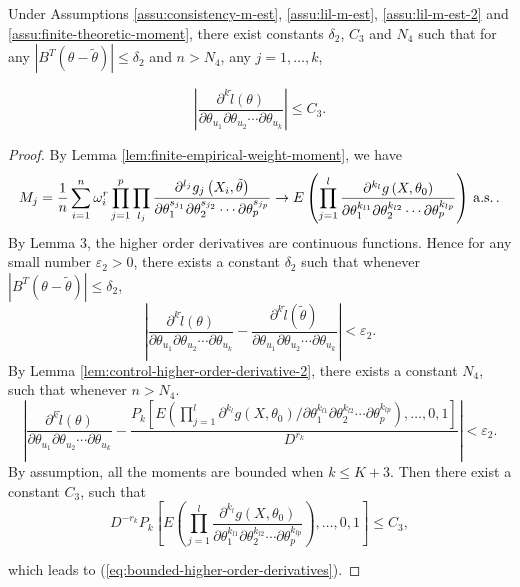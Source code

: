 \begin{lemma}
\label{lem:bounded-high-order-der-2} Under Assumptions \ref{assu:consistency-m-est}, \ref{assu:lil-m-est}, \ref{assu:lil-m-est-2} and 
\ref{assu:finite-theoretic-moment},
there exist constants $\delta_{2}$, $C_{3}$ and $N_{4}$ such that
for any $\left|B^T\left(\theta-\tilde{\theta}\right)\right|\le\delta_{2}$
and $n>N_{4}$, any $j=1,\ldots,k$,%
\begin{comment}
need add consistency conditions for M-Estimator
\end{comment}
{} 
\begin{equation}
\left|\frac{\partial^{k}\tilde{l}\left(\theta\right)}{\partial\theta_{u_{1}}\partial\theta_{u_{2}}\cdots\partial\theta_{u_{k}}}\right|\le C_{3}.\label{eq:bounded-higher-order-derivatives}
\end{equation}
\end{lemma}
\begin{proof}
By Lemma \ref{lem:finite-empirical-weight-moment}, we have 
\[
M_{j}=\frac{1}{n}\sum_{i=1}^{n}\omega_{i}^{r}\prod_{j=1}^{p}\prod_{l_{j}}\frac{\partial^{l_{j}}g_{j}\left(X_{i},\tilde{\theta}\right)}{\partial\theta_{1}^{s_{j_{1}}}\partial\theta_{2}^{s_{j_{2}}}\cdots\partial\theta_{p}^{s_{j_{p}}}}
\rightarrow E\left(\prod_{j=1}^{l}\frac{\partial^{k_{l}}g\left(X,\theta_{0}\right)}{\partial\theta_{1}^{k_{l1}}\partial\theta_{2}^{k_{l2}}\cdots\partial\theta_{p}^{k_{lp}}}\right)\,\mathrm{a.s.}\,.
\]
 By Lemma 3, the higher order
derivatives are continuous functions. Hence for any small number $\varepsilon_{2}>0$,
there exists a constant $\delta_{2}$ such that whenever $\left|B^T\left(\theta-\tilde{\theta}\right)\right|\le\delta_{2}$,
\[
\left|\frac{\partial^{k}\tilde{l}\left(\theta\right)}{\partial\theta_{u_{1}}\partial\theta_{u_{2}}\cdots\partial\theta_{u_{k}}}-\frac{\partial^{k}\tilde{l}\left(\tilde{\theta}\right)}{\partial\theta_{u_{1}}\partial\theta_{u_{2}}\cdots\partial\theta_{u_{k}}}\right|<\varepsilon_{2}.
\]
By Lemma \ref{lem:control-higher-order-derivative-2}, there exists
a constant $N_{4}$, such that whenever $n>N_{4}$. 
\[
\left|\frac{\partial^{k}\tilde{l}\left(\theta\right)}{\partial\theta_{u_{1}}\partial\theta_{u_{2}}\cdots\partial\theta_{u_{k}}}-
\frac{P_{k}\left[ E\left(\prod_{j=1}^{l} \partial^{k_{l}}g\left(X,\theta_{0}\right) / \partial\theta_{1}^{k_{l1}}\partial\theta_{2}^{k_{l2}}\cdots\partial\theta_{p}^{k_{lp}} \right) ,\ldots,0,1\right]}{D^{r_{k}}}\right|
<\varepsilon_{2}.
\]
By assumption, all the moments are bounded when $k\le K+3$.
Then there exist a constant $C_{3}$, such that 
\[
D^{-r_{k}}P_{k}\left[E\left(\prod_{j=1}^{l}\frac{\partial^{k_{l}}g\left(X,\theta_{0}\right)}{\partial\theta_{1}^{k_{l1}}\partial\theta_{2}^{k_{l2}}\cdots\partial\theta_{p}^{k_{lp}}}\right) ,\ldots,0,1\right]\le C_{3},
\]
\begin{comment}
change the length
\end{comment}
 which leads to (\ref{eq:bounded-higher-order-derivatives}). 
\end{proof}

